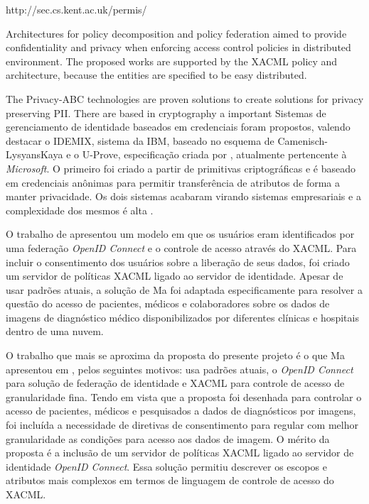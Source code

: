 \documentclass{doublecol-new}
\begin{document}
http://sec.cs.kent.ac.uk/permis/


Architectures for policy decomposition \cite{lin2008policy} and policy federation \cite{decat2012toward,decat2013federated,decat2014middleware} aimed to provide confidentiality and privacy when enforcing access control policies in distributed environment. The proposed works are supported by the XACML policy and architecture, because the entities are specified to be easy distributed.



The Privacy-ABC technologies are proven solutions to create solutions for privacy preserving PII. There are based in cryptography a important 
Sistemas de gerenciamento de identidade baseados em credenciais foram propostos, valendo destacar o IDEMIX\cite{camenisch2002design}, sistema da IBM, baseado no esquema de Camenisch-LysyansKaya \cite{camenisch2001efficient} e o U-Prove, especificação criada por \cite{brands2000rethinking}, atualmente pertencente à \textit{Microsoft}. O primeiro foi criado a partir de primitivas criptográficas e é baseado em credenciais anônimas para permitir transferência de atributos de forma a manter privacidade. Os dois sistemas acabaram virando sistemas empresariais e a complexidade dos mesmos é alta \cite{nogueira2014aprimoramento}.

O trabalho de \cite{ma2015cloud} apresentou um modelo em que os usuários eram identificados por uma federação \textit{OpenID Connect} e o controle de acesso através do XACML. Para incluir o consentimento dos usuários sobre a liberação de seus dados, foi criado um servidor de políticas XACML ligado ao servidor de identidade. Apesar de usar padrões atuais, a solução de Ma foi adaptada especificamente para resolver a questão do acesso de pacientes, médicos e colaboradores sobre os dados de imagens de diagnóstico médico disponibilizados por diferentes clínicas e hospitais dentro de uma nuvem.

O trabalho que mais se aproxima da proposta do presente projeto é o que Ma apresentou em \cite{ma2015cloud}, pelos seguintes motivos: usa padrões atuais, o \textit{OpenID Connect} para solução de federação de identidade e XACML para controle de acesso de granularidade fina. Tendo em vista que a proposta foi desenhada para controlar o acesso de pacientes, médicos e pesquisados a dados de diagnósticos por imagens, foi incluída a necessidade de diretivas de consentimento para regular com melhor granularidade as condições para acesso aos dados de imagem. O mérito da proposta é a inclusão de um servidor de políticas XACML ligado ao servidor de identidade \textit{OpenID Connect}. Essa solução permitiu descrever os escopos e atributos mais complexos em termos de linguagem de controle de acesso do XACML.
\end{document}
